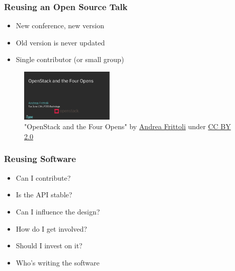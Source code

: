 \documentclass[aspectratio=169,11pt,hyperref={colorlinks=true}]{beamer}
\begin{document}
\begin{frame}
  \frametitle{Reusing an Open Source Talk}
    \begin{overlayarea}{\textwidth}{.3\textheight}
      \begin{itemize}
          \item{New conference, new version}
          \item{Old version is never updated}
          \item{Single contributor (or small group)}
      \end{itemize}
    \end{overlayarea}
    \begin{figure}
      \includegraphics[width=0.4\textwidth]{pictures/old_presentation.png}
         \caption{"OpenStack and the Four Opens" by \href{https://afrittoli.github.io/openstack-four-opens/}{Andrea Frittoli} under \href{https://creativecommons.org/licenses/by/2.0/}{CC BY 2.0}}
    \end{figure}
\end{frame}

\begin{frame}
  \frametitle{Reusing Software}
    \begin{itemize}
        \item{Can I contribute?}
        \item{Is the API stable?}
        \item{Can I influence the design?}
        \item{How do I get involved?}
        \item{Should I invest on it?}
    \end{itemize}
    \begin{itemize}
        \item{Who's writing the software}
    \end{itemize}
\end{frame}

\end{document}
